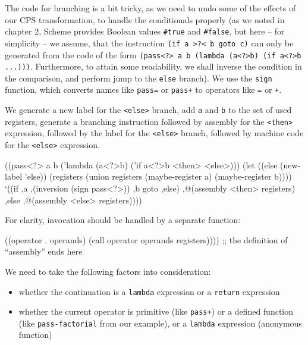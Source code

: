 The code for branching is a bit tricky, as we need
to undo some of the effects of our CPS transformation, to handle
the conditionals properly (as we noted in chapter 2, Scheme
provides Boolean values \texttt{\#true} and \texttt{\#false}, but
here -- for simplicity -- we assume, that the instruction
\texttt{(if a >?< b goto c)} can only be generated from the
code of the form \texttt{(pass<?> a b (lambda (a<?>b) (if a<?>b ...)))}.
Furthermore, to attain some readability, we shall inverse the
condition in the comparison, and perform jump to the \texttt{else}
branch). We use the \texttt{sign} function, which converts names
like \texttt{pass=} or \texttt{pass+} to operators like \texttt{=}
or \texttt{+}.

We generate a new label for the \texttt{<else>} branch,
add \texttt{a} and \texttt{b} to the set of used registers,
generate a branching instruction followed by assembly
for the \texttt{<then>} expression, followed by the label
for the \texttt{<else>} branch, followed by machine code
for the \texttt{<else>} expression.

\begin{Snippet}
        ((pass<?> a b ('lambda (a<?>b) ('if a<?>b
                                            <then>
                                            <else>)))
          (let ((else (new-label 'else))
                (registers (union registers
                                  (maybe-register a)
                                  (maybe-register b))))
            `((if ,a ,(inversion (sign pass<?>)) ,b goto ,else)
              ,@(assembly <then> registers)
              ,else
              ,@(assembly <else> registers))))
\end{Snippet}

For clarity, invocation should be handled by a separate
function:

\begin{Snippet}
        ((operator . operands)
         (call operator operands registers))))
    ;; the definition of ``assembly'' ends here
\end{Snippet}

We need to take the following factors into consideration:
\begin{itemize}
\item whether the continuation is a \texttt{lambda} expression
  or a \texttt{return} expression
\item whether the current operator is primitive (like \texttt{pass+})
  or a defined function (like \texttt{pass-factorial} from our
  example), or a \texttt{lambda} expression (anonymous function)
\end{itemize}

